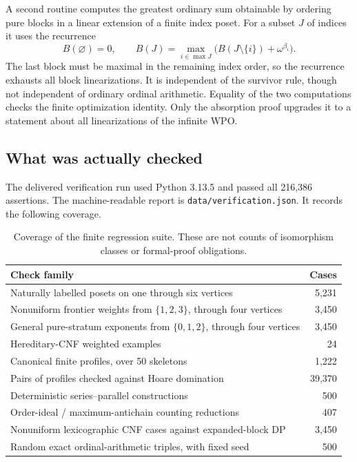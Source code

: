 \documentclass[11pt,a4paper]{article}
\theoremstyle{definition}
\theoremstyle{remark}
\begin{document}
A second routine computes the greatest ordinary sum obtainable by ordering
pure blocks in a linear extension of a finite index poset. For a subset
$J$ of indices it uses the recurrence
\begin{equation}\label{eq:DP}
 B(\varnothing)=0,
 \qquad
 B(J)=\max_{i\in\max J}\bigl(B(J\setminus\{i\})+\omega^{\beta_i}\bigr).
\end{equation}
The last block must be maximal in the remaining index order, so the
recurrence exhausts all block linearizations. It is independent of the
survivor rule, though not independent of ordinary ordinal arithmetic.
Equality of the two computations checks the finite optimization identity.
Only the absorption proof upgrades it to a statement about all
linearizations of the infinite WPO.

\subsection{What was actually checked}

The delivered verification run used Python 3.13.5 and passed all
216,386 assertions. The machine-readable report is
\texttt{data/verification.json}. It records the following coverage.

\begin{table}[htbp]
\centering
\small
\begin{tabularx}{\linewidth}{@{}Xr@{}}
\toprule
Check family & Cases\\
\midrule
Naturally labelled posets on one through six vertices & 5,231\\
Nonuniform frontier weights from $\{1,2,3\}$, through four vertices & 3,450\\
General pure-stratum exponents from $\{0,1,2\}$, through four vertices & 3,450\\
Hereditary-CNF weighted examples & 24\\
Canonical finite profiles, over 50 skeletons & 1,222\\
Pairs of profiles checked against Hoare domination & 39,370\\
Deterministic series--parallel constructions & 500\\
Order-ideal / maximum-antichain counting reductions & 407\\
Nonuniform lexicographic CNF cases against expanded-block DP & 3,450\\
Random exact ordinal-arithmetic triples, with fixed seed & 500\\
\bottomrule
\end{tabularx}
\caption{Coverage of the finite regression suite. These are not counts of
isomorphism classes or formal-proof obligations.}
\label{tab:verification}
\end{table}
\end{document}
